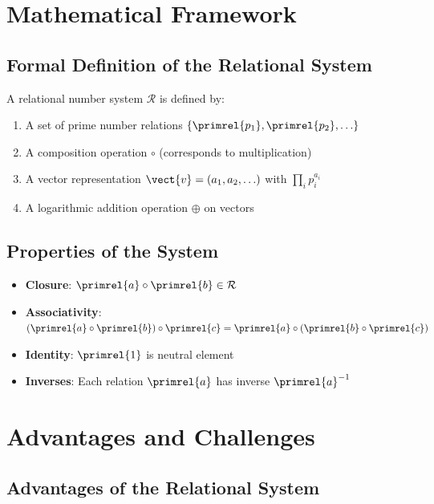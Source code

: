 	\section{Mathematical Framework}
	
	\subsection{Formal Definition of the Relational System}
	
	\begin{theorem}
		A relational number system $\mathcal{R}$ is defined by:
		\begin{enumerate}
			\item A set of prime number relations $\{\primrel{p_1}, \primrel{p_2}, \ldots\}$
			\item A composition operation $\circ$ (corresponds to multiplication)
			\item A vector representation $\vect{v} = (a_1, a_2, \ldots)$ with $\prod_i p_i^{a_i}$
			\item A logarithmic addition operation $\oplus$ on vectors
		\end{enumerate}
	\end{theorem}
	
	\subsection{Properties of the System}
	
	\begin{itemize}
		\item \textbf{Closure}: $\primrel{a} \circ \primrel{b} \in \mathcal{R}$
		\item \textbf{Associativity}: $(\primrel{a} \circ \primrel{b}) \circ \primrel{c} = \primrel{a} \circ (\primrel{b} \circ \primrel{c})$
		\item \textbf{Identity}: $\primrel{1}$ is neutral element
		\item \textbf{Inverses}: Each relation $\primrel{a}$ has inverse $\primrel{a}^{-1}$
	\end{itemize}
	
	\section{Advantages and Challenges}
	
	\subsection{Advantages of the Relational System}
	
